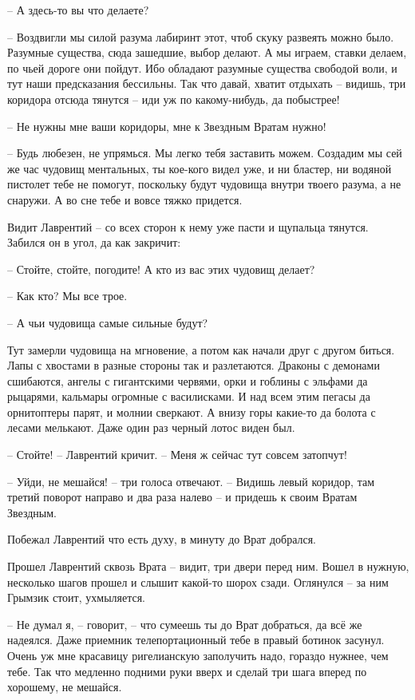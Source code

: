 \documentclass[ebook,oneside,final,openright]{memoir}
\begin{document}
– А здесь-то вы что делаете?\par
– Воздвигли мы силой разума лабиринт этот, чтоб скуку развеять можно было. Разумные существа, сюда зашедшие, выбор делают. А мы играем, ставки делаем, по чьей дороге они пойдут. Ибо обладают разумные существа свободой воли, и тут наши предсказания бессильны. Так что давай, хватит отдыхать – видишь, три коридора отсюда тянутся – иди уж по какому-нибудь, да побыстрее!\par
– Не нужны мне ваши коридоры, мне к Звездным Вратам нужно!\par
– Будь любезен, не упрямься. Мы легко тебя заставить можем. Создадим мы сей же час чудовищ ментальных, ты кое-кого видел уже, и ни бластер, ни водяной пистолет тебе не помогут, поскольку будут чудовища внутри твоего разума, а не снаружи. А во сне тебе и вовсе тяжко придется.\par
\par
Видит Лаврентий – со всех сторон к нему уже пасти и щупальца тянутся. Забился он в угол, да как закричит:\par
– Стойте, стойте, погодите! А кто из вас этих чудовищ делает?\par
– Как кто? Мы все трое.\par
– А чьи чудовища самые сильные будут?\par
Тут замерли чудовища на мгновение, а потом как начали друг с другом биться. Лапы с хвостами в разные стороны так и разлетаются. Драконы с демонами сшибаются, ангелы с гигантскими червями, орки и гоблины с эльфами да рыцарями, кальмары огромные с василисками. И над всем этим пегасы да орнитоптеры парят, и молнии сверкают. А внизу горы какие-то да болота с лесами мелькают. Даже один раз черный лотос виден был. \par
– Стойте! – Лаврентий кричит. – Меня ж сейчас тут совсем затопчут!\par
– Уйди, не мешайся! – три голоса отвечают. – Видишь левый коридор, там третий поворот направо и два раза налево – и придешь к своим Вратам Звездным.\par
\par
Побежал Лаврентий что есть духу, в минуту до Врат добрался.\par
\par
Прошел Лаврентий сквозь Врата – видит, три двери перед ним. Вошел в нужную, несколько шагов прошел и слышит какой-то шорох сзади. Оглянулся – за ним Грымзик стоит, ухмыляется. \par
\par
– Не думал я, – говорит, – что сумеешь ты до Врат добраться, да всё же надеялся. Даже приемник телепортационный тебе в правый ботинок засунул. Очень уж мне красавицу ригелианскую заполучить надо, гораздо нужнее, чем тебе. Так что медленно подними руки вверх и сделай три шага вперед по хорошему, не мешайся.\par
\end{document}
